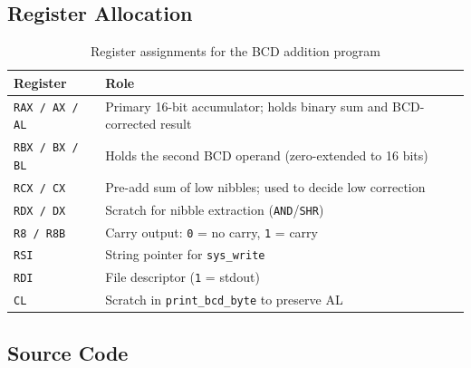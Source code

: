 \documentclass[12pt,a4paper]{article}
\newcommand{\code}[1]{\texttt{\small #1}}
\begin{document}
\subsection{Register Allocation}

\begin{table}[H]
  \centering
  \caption{Register assignments for the BCD addition program}
  \renewcommand{\arraystretch}{1.3}
  \begin{tabular}{|l|l|}
    \hline
    \textbf{Register} & \textbf{Role} \\
    \hline
    \code{RAX / AX / AL} & Primary 16-bit accumulator; holds binary sum and BCD-corrected result \\
    \code{RBX / BX / BL} & Holds the second BCD operand (zero-extended to 16 bits) \\
    \code{RCX / CX}      & Pre-add sum of low nibbles; used to decide low correction \\
    \code{RDX / DX}      & Scratch for nibble extraction (\code{AND}/\code{SHR}) \\
    \code{R8 / R8B}      & Carry output: \texttt{0} = no carry, \texttt{1} = carry \\
    \code{RSI}           & String pointer for \code{sys\_write} \\
    \code{RDI}           & File descriptor (\texttt{1} = stdout) \\
    \code{CL}            & Scratch in \code{print\_bcd\_byte} to preserve AL \\
    \hline
  \end{tabular}
\end{table}

\subsection{Source Code}
\end{document}
